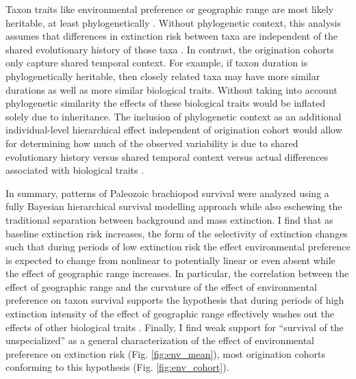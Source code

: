 \documentclass{article}
\begin{document}
Taxon traits like environmental preference or geographic range \citep{Jablonski1987,Hunt2005b} are most likely heritable, at least phylogenetically \citep{Lynch1991,Housworth2004}. Without phylogenetic context, this analysis assumes that differences in extinction risk between taxa are independent of the shared evolutionary history of those  taxa \citep{Felsenstein1985b}. In contrast, the origination cohorts only capture shared temporal context. For example, if taxon duration is phylogenetically heritable, then closely related taxa may have more similar durations as well as more similar biological traits. Without taking into account phylogenetic similarity the effects of these biological traits would be inflated solely due to inheritance. The inclusion of phylogenetic context as an additional individual-level hierarchical effect independent of origination cohort would allow for determining how much of the observed variability is due to shared evolutionary history versus shared temporal context versus actual differences associated with biological traits \citep{Smits2015}. 

In summary, patterns of Paleozoic brachiopod survival were analyzed using a fully Bayesian hierarchical survival modelling approach while also eschewing the traditional separation between background and mass extinction. I find that as baseline extinction risk increases, the form of the selectivity of extinction changes such that during periods of low extinction risk the effect environmental preference is expected to change from nonlinear to potentially linear or even absent while the effect of geographic range increases. In particular, the correlation between the effect of geographic range and the curvature of the effect of environmental preference on taxon survival supports the hypothesis that during periods of high extinction intensity of the effect of geographic range effectively washes out the effects of other biological traits \citep{Jablonski1987,Raup1991b}. Finally, I find weak support for ``survival of the unspecialized'' \citep{Simpson1944,Liow2004a,Liow2007b,Nurnberg2013a,Nurnberg2015} as a general characterization of the effect of environmental preference on extinction risk (Fig. \ref{fig:env_mean}), most origination cohorts conforming to this hypothesis (Fig. \ref{fig:env_cohort}). 
\end{document}
